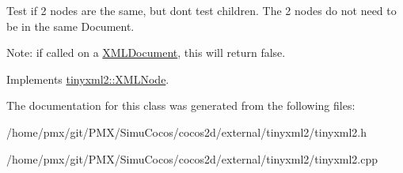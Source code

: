 Test if 2 nodes are the same, but don\textquotesingle{}t test children. The 2 nodes do not need to be in the same Document.

Note\+: if called on a \hyperlink{classtinyxml2_1_1XMLDocument}{X\+M\+L\+Document}, this will return false. 

Implements \hyperlink{classtinyxml2_1_1XMLNode_a7ce18b751c3ea09eac292dca264f9226}{tinyxml2\+::\+X\+M\+L\+Node}.



The documentation for this class was generated from the following files\+:\begin{DoxyCompactItemize}
\item 
/home/pmx/git/\+P\+M\+X/\+Simu\+Cocos/cocos2d/external/tinyxml2/tinyxml2.\+h\item 
/home/pmx/git/\+P\+M\+X/\+Simu\+Cocos/cocos2d/external/tinyxml2/tinyxml2.\+cpp\end{DoxyCompactItemize}
